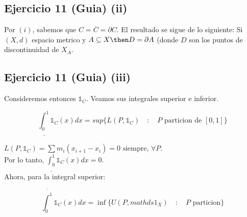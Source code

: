 \documentclass[a4paper]{report}
\begin{document}
\subsection{Ejercicio 11 (Guia) (ii)}  

\begin{Dem}
	Por $(i)$, sabemos que $C=\overline{C}=\partial C$. El resultado se sigue de lo siguiente: Si $(X,d)$ espacio metrico y $A\subseteq X \then D = \partial A$ (donde $D$ son los puntos de discontinuidad de $X_A$.

\end{Dem}

\subsection{Ejercicio 11 (Guia) (iii)}  

\begin{Dem}
	Consideremos entonces $\mathds{1}_C$. Veamos sus integrales superior e inferior.

	\[
	\underline{\int_{0}^{1}} \mathds{1}_C(x) dx = sup \{L(P,\mathds{1}_C) \quad : \quad P \text{ particion de } [0,1] \}
	\]

	$L(P,\mathds{1}_C) = \sum m_i (x_{i+1}-x_i)=0 \text{ siempre, } \forall P$.\\

	Por lo tanto, $\underline{\int_{0}^{1}} \mathds{1}_C (x) dx =0 $.\\

	Ahora, para la integral superior:

	\[
	\overline{\int_{0}^{1}} \mathds{1}_C (x) dx = \inf \{U(P,mathds{1}_X) \quad : \quad P \text{ particion} \}
	\]
\end{Dem}
\end{document}
